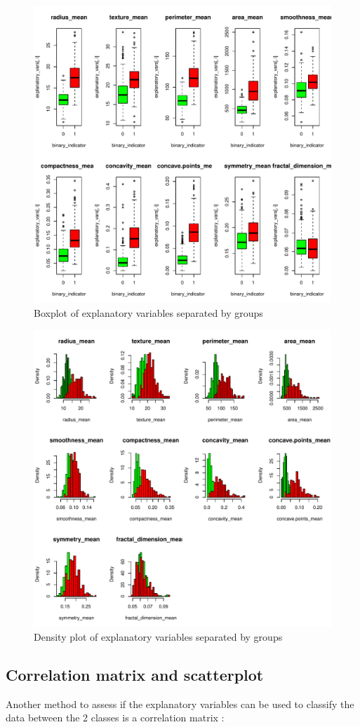 \begin{figure}[H]
    \centering
    \includegraphics[width=.55\textwidth]{figs/q1_boxplot.pdf}
    \caption{Boxplot of explanatory variables separated by groups}
    \label{fig:q1_boxplot}
\end{figure}

\begin{figure}[H]
    \centering
    \includegraphics[width=.55\textwidth]{figs/q1_histogram.pdf}
    \caption{Density plot of explanatory variables separated by groups}
    \label{fig:q1_density}
\end{figure}

\newpage
\subsection{Correlation matrix and scatterplot}
Another method to assess if the explanatory variables can be used to classify the data between the 2 classes is a correlation matrix : 

